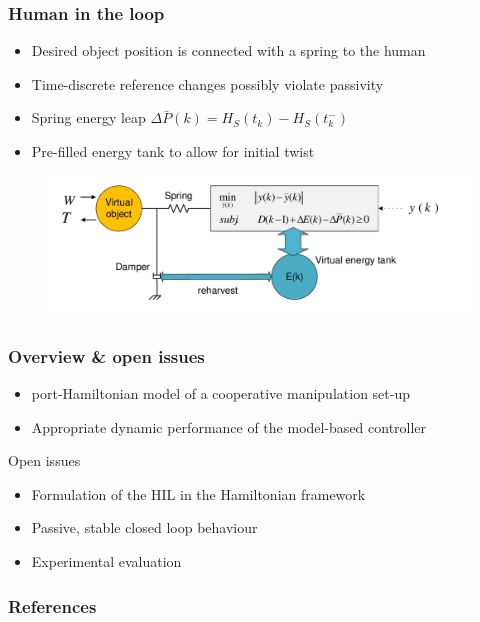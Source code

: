 \documentclass[student]{ITRslides}
\begin{document}
\begin{frame}
	\frametitle{Human in the loop}
	\begin{itemize}
			\item Desired object position is connected with a spring to the human
			\item Time-discrete reference changes possibly violate passivity
			\item Spring energy leap $\Delta \bar{P}(k) = H_S(t_k) - H_S(t_k^-)$ 
			\item Pre-filled energy tank to allow for initial twist
		\end{itemize}
		\begin{figure}
					\centering
					\includegraphics[width=1\textwidth]{pspm.pdf}

		\end{figure}
\end{frame}

\begin{frame}
	\frametitle{Overview \& open issues}
	\begin{itemize}
		\item port-Hamiltonian model of a cooperative manipulation set-up
		\item Appropriate dynamic performance of the model-based controller

  
	\end{itemize}
		\begin{block}{Open issues}
\begin{itemize}
\item Formulation of the HIL in the Hamiltonian framework
\item Passive, stable closed loop behaviour
\item Experimental evaluation
\end{itemize}
	\end{block}	
\end{frame}
\appendix
\begin{frame}[allowframebreaks]
	\frametitle{References}
	\printbibliography
\end{frame}
\end{document}
